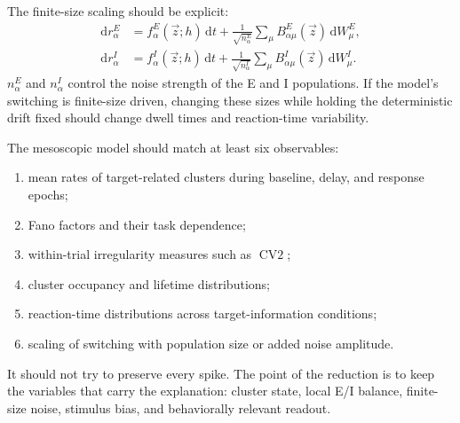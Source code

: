 The finite-size scaling should be explicit:
%
\begin{align}
  \mathrm{d}r_{\alpha}^{E}
  &=
  f_{\alpha}^{E}(\vec z;h)\,\mathrm{d}t
  +
  \frac{1}{\sqrt{n_{\alpha}^{E}}}
  \sum_{\mu}B_{\alpha\mu}^{E}(\vec z)\,\mathrm{d}W_{\mu}^{E},
  \label{eq:mesoscopic-e-noise-ch13}\\
  \mathrm{d}r_{\alpha}^{I}
  &=
  f_{\alpha}^{I}(\vec z;h)\,\mathrm{d}t
  +
  \frac{1}{\sqrt{n_{\alpha}^{I}}}
  \sum_{\mu}B_{\alpha\mu}^{I}(\vec z)\,\mathrm{d}W_{\mu}^{I}.
  \label{eq:mesoscopic-i-noise-ch13}
\end{align}
%
$n_{\alpha}^{E}$ and $n_{\alpha}^{I}$ control the noise strength of the E and I populations. If the model's switching is finite-size driven, changing these sizes while holding the deterministic drift fixed should change dwell times and reaction-time variability.

The mesoscopic model should match at least six observables:
%
\begin{enumerate}[leftmargin=*]
  \item mean rates of target-related clusters during baseline, delay, and response epochs;
  \item Fano factors and their task dependence;
  \item within-trial irregularity measures such as $\operatorname{CV2}$;
  \item cluster occupancy and lifetime distributions;
  \item reaction-time distributions across target-information conditions;
  \item scaling of switching with population size or added noise amplitude.
\end{enumerate}

It should not try to preserve every spike. The point of the reduction is to keep the variables that carry the explanation: cluster state, local E/I balance, finite-size noise, stimulus bias, and behaviorally relevant readout.

